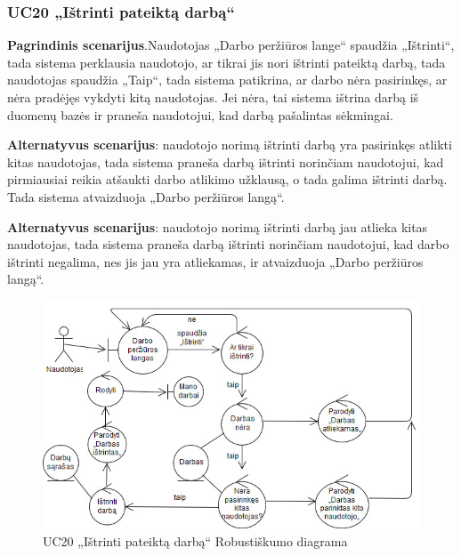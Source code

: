 \documentclass{VUMIFPSbakalaurinis}
\begin{document}
\subsubsection{UC20 „Ištrinti pateiktą darbą“}
\textbf{Pagrindinis scenarijus}.Naudotojas „Darbo peržiūros lange“ spaudžia „Ištrinti“, tada sistema perklausia naudotojo, ar tikrai jis nori ištrinti pateiktą darbą, tada naudotojas spaudžia „Taip“, tada sistema patikrina, ar darbo nėra pasirinkęs, ar nėra pradėjęs vykdyti kitą naudotojas. Jei nėra, tai sistema ištrina darbą iš duomenų bazės ir praneša naudotojui, kad darbą pašalintas sėkmingai.
\par \textbf{Alternatyvus scenarijus}: naudotojo norimą ištrinti darbą yra pasirinkęs atlikti kitas naudotojas, tada sistema praneša darbą ištrinti norinčiam naudotojui, kad pirmiausiai reikia atšaukti darbo atlikimo užklausą, o tada galima ištrinti darbą. Tada sistema atvaizduoja „Darbo peržiūros langą“.\\ 
\par \textbf{Alternatyvus scenarijus}: naudotojo norimą ištrinti darbą jau atlieka kitas naudotojas, tada sistema praneša darbą ištrinti norinčiam naudotojui, kad darbo ištrinti negalima, nes jis jau yra atliekamas, ir atvaizduoja „Darbo peržiūros langą“.

\begin{figure}[H]
	\centering
	\includegraphics[scale=0.6]{img/Robustness/UC20}
	\caption{UC20 „Ištrinti pateiktą darbą“ Robustiškumo diagrama}
	\label{img:uc20rob}
\end{figure}
\end{document}
